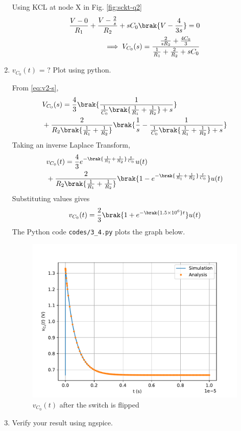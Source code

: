\documentclass[journal,12pt,twocolumn]{IEEEtran}
\renewcommand\thesection{\arabic{section}}
\begin{document}
\begin{enumerate}[label=\arabic*.,ref=\thesection.\theenumi]
\solution Using KCL at node X in Fig. \ref{fig:sckt-q2}
\begin{align}
    \frac{V - 0}{R_1} + \frac{V - \frac{2}{s}}{R_2} + sC_0\brak{V - \frac{4}{3s}} = 0 \\
\implies V_{C_0}(s) = \frac{\frac{2}{sR_2} + \frac{4C_0}{3}}{\frac{1}{R_1} + \frac{2}{R_2} + sC_0}
\label{eq:v2-s}
\end{align}
\item $v_{C_0}(t)$ = ? Plot using python.

\solution From \eqref{eq:v2-s},
\begin{align}
    &V_{C_0}(s) = \frac{4}{3}\brak{\frac{1}{\frac{1}{C_0}\brak{\frac{1}{R_1} + \frac{1}{R_2}}+s}} \nonumber \\
    &+ \frac{2}{R_2\brak{\frac{1}{R_1} +\frac{1}{R_2}}}\brak{\frac{1}{s} - \frac{1}{\frac{1}{C_0}\brak{\frac{1}{R_1} + \frac{1}{R_2}} + s}}
\end{align}
Taking an inverse Laplace Transform,
\begin{align}
    &v_{C_0}(t) = \frac{4}{3}e^{-\brak{\frac{1}{R_1} + \frac{1}{R_2}}\frac{t}{C_0}}u(t) \nonumber \\ 
    &+ \frac{2}{R_2\brak{\frac{1}{R_1}+\frac{1}{R_2}}}\brak{1 - e^{-\brak{\frac{1}{R_1} + \frac{1}{R_2}}\frac{t}{C_0}}}u(t)
\end{align}
Substituting values gives
\begin{align}
    v_{C_0}(t) = \frac{2}{3}\brak{1 +e^{-\brak{1.5 \times 10^6}t}}u(t)
    \label{eq:v2-t}
\end{align}
The Python code \texttt{codes/3\_4.py} plots the graph below.
\begin{figure}[!htb]
    \includegraphics[width=\columnwidth]{figs/3_4.pdf}
    \caption{$v_{C_0}(t)$ after the switch is flipped}
    \label{fig:v2-t}
\end{figure}
\item Verify your result using ngspice.


\end{enumerate}
\end{document}
